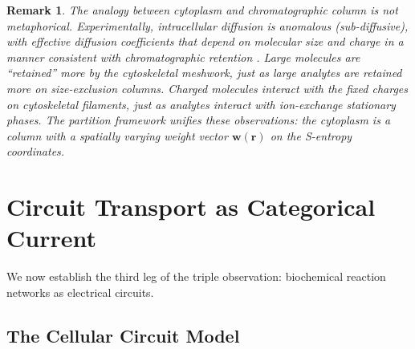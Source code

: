 \documentclass[11pt,twocolumn,a4paper]{article}
\newtheorem{remark}[theorem]{Remark}
\begin{document}
\begin{remark}
The analogy between cytoplasm and chromatographic column is not
metaphorical. Experimentally, intracellular diffusion is anomalous
(sub-diffusive), with effective diffusion coefficients that depend
on molecular size and charge in a manner consistent with
chromatographic retention \citep{luby1999}. Large molecules are
``retained'' more by the cytoskeletal meshwork, just as large analytes
are retained more on size-exclusion columns. Charged molecules interact
with the fixed charges on cytoskeletal filaments, just as analytes
interact with ion-exchange stationary phases. The partition framework
unifies these observations: the cytoplasm is a column with a
spatially varying weight vector $\mathbf{w}(\mathbf{r})$ on the
S-entropy coordinates.
\end{remark}


\section{Circuit Transport as Categorical Current}
\label{sec:circuit-transport}

We now establish the third leg of the triple observation: biochemical
reaction networks as electrical circuits.

\subsection{The Cellular Circuit Model}
\end{document}
